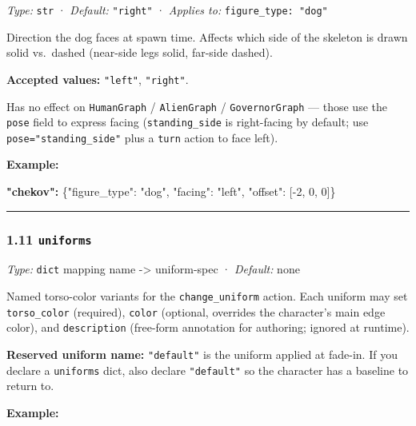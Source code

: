 \documentclass[
  11pt,
]{book}
\newenvironment{Shaded}{}{}
\newcommand{\DataTypeTok}[1]{\textcolor[rgb]{0.56,0.13,0.00}{#1}}
\newcommand{\DecValTok}[1]{\textcolor[rgb]{0.25,0.63,0.44}{#1}}
\newcommand{\ErrorTok}[1]{\textcolor[rgb]{1.00,0.00,0.00}{\textbf{#1}}}
\newcommand{\FunctionTok}[1]{\textcolor[rgb]{0.02,0.16,0.49}{#1}}
\newcommand{\OtherTok}[1]{\textcolor[rgb]{0.00,0.44,0.13}{#1}}
\newcommand{\StringTok}[1]{\textcolor[rgb]{0.25,0.44,0.63}{#1}}
\begin{document}
\emph{Type:} \texttt{str} · \emph{Default:} \texttt{"right"} ·
\emph{Applies to:} \texttt{figure\_type:\ "dog"}

Direction the dog faces at spawn time. Affects which side of the
skeleton is drawn solid vs.~dashed (near-side legs solid, far-side
dashed).

\textbf{Accepted values:} \texttt{"left"}, \texttt{"right"}.

Has no effect on \texttt{HumanGraph} / \texttt{AlienGraph} /
\texttt{GovernorGraph} --- those use the \texttt{pose} field to express
facing (\texttt{standing\_side} is right-facing by default; use
\texttt{pose="standing\_side"} plus a \texttt{turn} action to face
left).

\textbf{Example:}

\begin{Shaded}
\begin{Highlighting}[]
\ErrorTok{"chekov":} \FunctionTok{\{}\DataTypeTok{"figure\_type"}\FunctionTok{:} \StringTok{"dog"}\FunctionTok{,} \DataTypeTok{"facing"}\FunctionTok{:} \StringTok{"left"}\FunctionTok{,}
           \DataTypeTok{"offset"}\FunctionTok{:} \OtherTok{[}\DecValTok{{-}2}\OtherTok{,} \DecValTok{0}\OtherTok{,} \DecValTok{0}\OtherTok{]}\FunctionTok{\}}
\end{Highlighting}
\end{Shaded}

\begin{center}\rule{0.5\linewidth}{0.5pt}\end{center}

\subsubsection{\texorpdfstring{1.11
\texttt{uniforms}}{1.11 uniforms}}\label{uniforms}

\emph{Type:} \texttt{dict} mapping name -\textgreater{} uniform-spec ·
\emph{Default:} none

Named torso-color variants for the \texttt{change\_uniform} action. Each
uniform may set \texttt{torso\_color} (required), \texttt{color}
(optional, overrides the character's main edge color), and
\texttt{description} (free-form annotation for authoring; ignored at
runtime).

\textbf{Reserved uniform name:} \texttt{"default"} is the uniform
applied at fade-in. If you declare a \texttt{uniforms} dict, also
declare \texttt{"default"} so the character has a baseline to return to.

\textbf{Example:}
\end{document}
